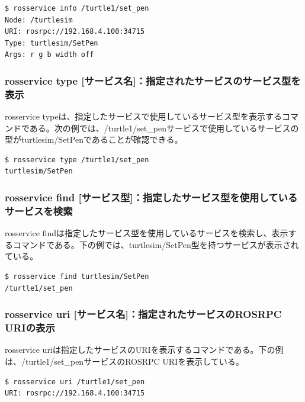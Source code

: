 \begin{lstlisting}[language=ROS]
$ rosservice info /turtle1/set_pen
Node: /turtlesim
URI: rosrpc://192.168.4.100:34715
Type: turtlesim/SetPen
Args: r g b width off
\end{lstlisting}

\subsubsection{rosservice type [サービス名]：指定されたサービスのサービス型を表示}

rosservice typeは、指定したサービスで使用しているサービス型を表示するコマンドである。次の例では、/turtle1/set\_penサービスで使用しているサービスの型がturtlesim/SetPenであることが確認できる。

\begin{lstlisting}[language=ROS]
$ rosservice type /turtle1/set_pen
turtlesim/SetPen
\end{lstlisting}

\subsubsection{rosservice find [サービス型]：指定したサービス型を使用しているサービスを検索}

rosservice findは指定したサービス型を使用しているサービスを検索し、表示するコマンドである。下の例では、turtlesim/SetPen型を持つサービスが表示されている。

\begin{lstlisting}[language=ROS]
$ rosservice find turtlesim/SetPen
/turtle1/set_pen
\end{lstlisting}

\subsubsection{rosservice uri [サービス名]：指定されたサービスのROSRPC URIの表示}

rosservice uriは指定したサービスのURIを表示するコマンドである。下の例は、/turtle1/set\_penサービスのROSRPC URIを表示している。

\begin{lstlisting}[language=ROS]
$ rosservice uri /turtle1/set_pen
URI: rosrpc://192.168.4.100:34715
\end{lstlisting}

